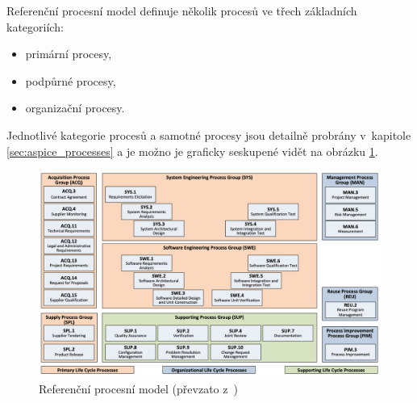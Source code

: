 \documentclass[czech,master]{diploma}
\begin{document}
Referenční procesní model definuje několik procesů ve třech základních kategoriích:

\begin{itemize}

\item primární procesy,
\item podpůrné procesy,
\item organizační procesy.

\end{itemize}

Jednotlivé kategorie procesů a samotné procesy jsou detailně probrány v~kapitole \ref{sec:aspice_processes} a je možno je graficky seskupené vidět na obrázku \ref{fig:prm}.
\begin{figure}[!ht]
    \centering
    \includegraphics[width=1\textwidth]{Diplomka/Figures/prm.png}
    \caption{Referenční procesní model (převzato z~\cite{ref:aspice_download_prm})}
    \label{fig:prm}
\end{figure}



\end{document}
